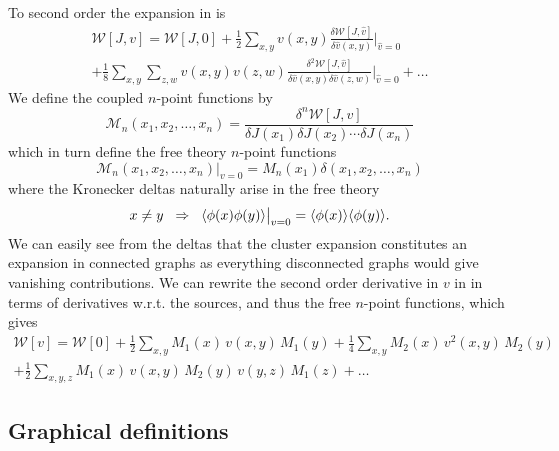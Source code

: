 %
To second order the expansion in  is
%
\begin{multline} \label{eq:linked_cluster_2nd_order}
  \mathcal{W}[J, v] = \mathcal{W}[J,0]
    + \frac{1}{2} \sum_{x,y} v(x,y) \frac{\delta \mathcal{W}[J,\hat{v}]}{\delta \hat{v}(x,y)} \bigg|_{\hat{v}=0} \\
    + \frac{1}{8} \sum_{x,y} \sum_{z,w} v(x,y) v(z,w) \frac{\delta^2
      \mathcal{W}[J,\hat{v}]}{\delta \hat{v}(x,y) \delta \hat{v}(z,w)}
    \bigg|_{\hat{v}=0} + \dots
\end{multline}
%
We define the coupled $n$-point functions by
%
\begin{equation}
  \mathcal{M}_n(x_1, x_2, \dots, x_n) = \frac{\delta^n \mathcal{W}[J,v]}{\delta
    J(x_1) \delta J(x_2) \cdots \delta J(x_n)}
\end{equation}
%
which in turn define the free theory $n$-point functions
%
\begin{equation}
   \mathcal{M}_n(x_1, x_2, \dots, x_n) \big|_{v = 0}
   = M_n(x_1) \delta(x_1, x_2, \dots, x_n)
\end{equation}
%
where the Kronecker deltas naturally arise in the free theory
%
\begin{equation}
  x \neq y \hskip .2cm\Rightarrow\hskip .2cm
    \langle \phi(x) \phi(y) \rangle \big|_{v=0} = \langle \phi(x) \rangle \langle \phi(y)
    \rangle.
\end{equation}
%
We can easily see from the deltas that the cluster expansion constitutes an
expansion in connected graphs as everything disconnected graphs would give
vanishing contributions. We can rewrite the second order derivative in $v$ in
 in terms of derivatives w.r.t. the sources,
and thus the free $n$-point functions, which gives
%
\begin{multline} \label{eq:free_energy_before_graph}
  \mathcal{W}[v] = \mathcal{W}[0] + \frac{1}{2} \sum_{x,y} M_1(x) \,v(x,y)\, M_1(y)
  + \frac{1}{4} \sum_{x,y} M_2(x) \,v^2(x,y)\, M_2(y)\\+ \frac{1}{2} \sum_{x,y,z}
  M_1(x) \,v(x,y)\, M_2(y) \,v(y,z)\, M_1(z) + \dots
\end{multline}

\subsection{Graphical definitions}

